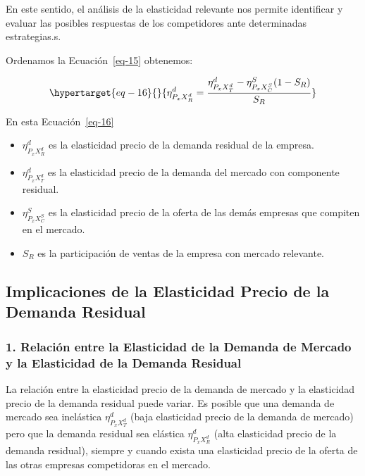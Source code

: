 \documentclass[
  letterpaper,
  DIV=11,
  numbers=noendperiod]{scrartcl}
\begin{document}
En este sentido, el análisis de la elasticidad relevante nos permite
identificar y evaluar las posibles respuestas de los competidores ante
determinadas estrategias.s.

Ordenamos la Ecuación~\ref{eq-15} obtenemos:

\begin{equation}\protect\hypertarget{eq-16}{}{
\eta_{P_{x}X_R^d}^d = \frac{\eta_{P_{x}X_T^d}^d - \eta_{P_{x}X_C^S}^{S} (1-S_R)}{S_R}
}\label{eq-16}\end{equation}

En esta Ecuación~\ref{eq-16}

\begin{itemize}
\item
  \(\eta_{P_{x}X_R^d}^d\) es la elasticidad precio de la demanda
  residual de la empresa.
\item
  \(\eta_{P_{x}X_T^d}^d\) es la elasticidad precio de la demanda del
  mercado con componente residual.
\item
  \(\eta_{P_{x}X_C^S}^S\) es la elasticidad precio de la oferta de las
  demás empresas que compiten en el mercado.
\item
  \(S_R\) es la participación de ventas de la empresa con mercado
  relevante.
\end{itemize}

\hypertarget{implicaciones-de-la-elasticidad-precio-de-la-demanda-residual}{%
\subsection{Implicaciones de la Elasticidad Precio de la Demanda
Residual}\label{implicaciones-de-la-elasticidad-precio-de-la-demanda-residual}}

\hypertarget{relaciuxf3n-entre-la-elasticidad-de-la-demanda-de-mercado-y-la-elasticidad-de-la-demanda-residual}{%
\subsubsection{1. Relación entre la Elasticidad de la Demanda de Mercado
y la Elasticidad de la Demanda
Residual}\label{relaciuxf3n-entre-la-elasticidad-de-la-demanda-de-mercado-y-la-elasticidad-de-la-demanda-residual}}

La relación entre la elasticidad precio de la demanda de mercado y la
elasticidad precio de la demanda residual puede variar. Es posible que
una demanda de mercado sea inelástica \(\eta_{P_{x}X_T^d}^d\) (baja
elasticidad precio de la demanda de mercado) pero que la demanda
residual sea elástica \(\eta_{P_{x}X_R^d}^d\) (alta elasticidad precio
de la demanda residual), siempre y cuando exista una elasticidad precio
de la oferta de las otras empresas competidoras en el mercado.
\end{document}
